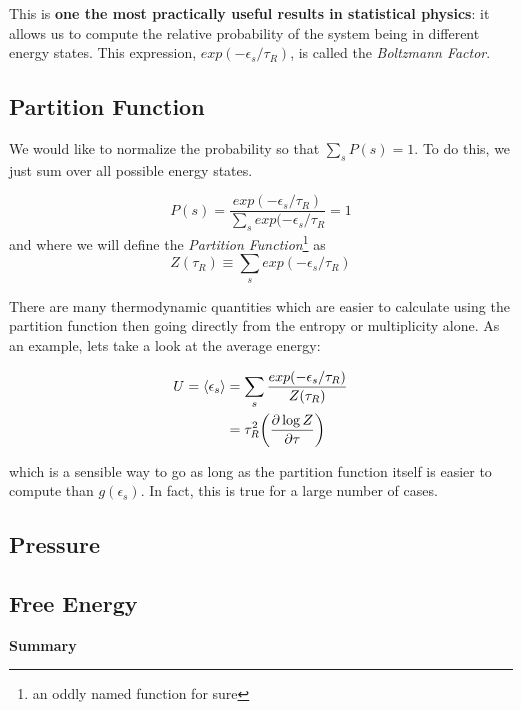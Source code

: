 This is \textbf{one the most practically useful results in statistical physics}: it allows us to compute the relative probability of the system being in different energy states. This expression, $exp(-\epsilon_s/\tau_R)$, is called the
\emph{Boltzmann Factor}.


\subsection{Partition Function}
We would like to normalize the probability so that 
$\sum_s P(s) = 1$. To do this, we just sum over all possible energy states.

\begin{equation}
P(s) = \frac{exp(-\epsilon_s/\tau_R)}{\sum_s exp(-\epsilon_s/\tau_R} = 1
\end{equation}
and where we will define the \emph{Partition Function}\footnote{an oddly named function for sure} as
\begin{equation}
Z(\tau_R) \equiv \sum_s exp(-\epsilon_s/\tau_R)
\end{equation}

There are many thermodynamic quantities which are easier to calculate using the partition function then going directly from the entropy or multiplicity alone. As an example, lets take a look at the average energy:

\begin{align}
U = \Braket{\epsilon_s} &= \sum_s \frac{exp(-\epsilon_s/\tau_R)}{Z(\tau_R)} \\
	&= \tau_R^2 \bigg(\frac{\partial \log Z}{\partial \tau}\bigg) 
\end{align}

which is a sensible way to go as long as the partition function itself is easier to compute than $g(\epsilon_s)$. In fact, this is true for a large number of cases.

\subsection{Pressure}

\subsection{Free Energy}


\textbf{Summary}


